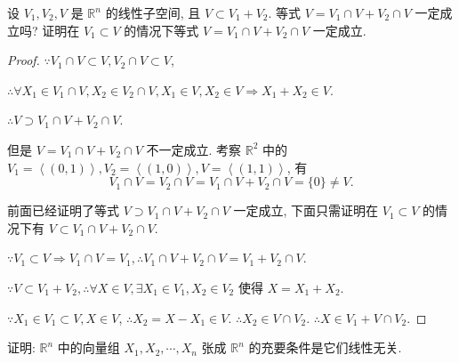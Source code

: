 \documentclass[color=black,device=normal,lang=cn,mode=geye]{elegantnote}
\begin{document}
\begin{exercise}%
    设 $V_1,V_2,V$ 是 $\mathbb{R}^n$ 的线性子空间, 且 $V\subset V_1+V_2$. 等式 $V=V_1\cap V+V_2\cap V$ 一定成立吗? 证明在 $V_1\subset V$ 的情况下等式 $V=V_1\cap V+V_2\cap V$ 一定成立.
\end{exercise}
\begin{proof}
    $\because V_1\cap V\subset V,V_2\cap V\subset V$,

    $\therefore\forall X_1\in V_1\cap V,X_2\in V_2\cap V,X_1\in V,X_2\in V\Rightarrow X_1+X_2\in V$.

    $\therefore V\supset V_1\cap V+V_2\cap V$.

    但是 $V=V_1\cap V+V_2\cap V$ 不一定成立. 考察 $\mathbb{R}^2$ 中的 $V_1=\left<(0,1)\right>,V_2=\left<(1,0)\right>,V=\left<(1,1)\right>$, 有
    \[V_1\cap V=V_2\cap V=V_1\cap V+V_2\cap V=\{0\}\neq V.\]

    前面已经证明了等式 $V\supset V_1\cap V+V_2\cap V$ 一定成立, 下面只需证明在 $V_1\subset V$ 的情况下有 $V\subset V_1\cap V+V_2\cap V$.

    $\because V_1\subset V\Rightarrow V_1\cap V=V_1,\therefore V_1\cap V+V_2\cap V=V_1+V_2\cap V$.

    $\because V\subset V_1+V_2,\therefore\forall X\in V,\exists X_1\in V_1,X_2\in V_2$ 使得 $X=X_1+X_2$.

    $\because X_1\in V_1\subset V,X\in V$, $\therefore X_2=X-X_1\in V$. $\therefore X_2\in V\cap V_2$. $\therefore X\in V_1+V\cap V_2$.
\end{proof}
\addtocounter{exercise}{2}
\begin{exercise}%
    证明: $\mathbb{R}^n$ 中的向量组 $X_1,X_2,\cdots,X_n$ 张成 $\mathbb{R}^n$ 的充要条件是它们线性无关.
\end{exercise}
\end{document}
